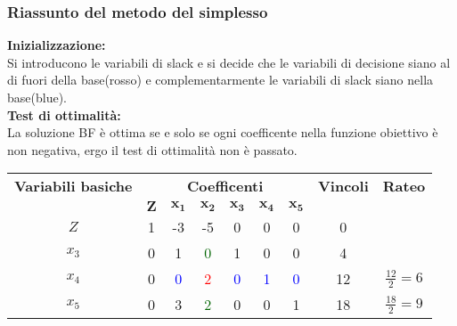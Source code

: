 \documentclass{article}
\begin{document}
\subsubsection{Riassunto del metodo del simplesso}
\textbf{Inizializzazione:} \\
Si introducono le variabili di slack e si decide che le variabili di decisione siano al di fuori della base(rosso) e complementarmente le variabili di slack siano nella base(blue). \\
\textbf{Test di ottimalità:} \\
La soluzione BF è ottima se e solo se ogni coefficente nella funzione obiettivo è non negativa, ergo il test di ottimalità non è passato.\\
\begin{table}[h]
  \centering
  \begin{tabular}{|c|c|c|c|c|c|c|c|c|}
    \hline
    {\textbf{Variabili basiche}} & \multicolumn{6}{|c|}{\textbf{Coefficenti}} & \textbf{Vincoli}    & \textbf{Rateo}                                                                                                     \\
    \cline{1-9}
                                 & $\mathbf{Z}$                               & $\mathbf{x_1}$      & $\mathbf{x_2}$           & $\mathbf{x_3}$      & $\mathbf{x_4}$      & $\mathbf{x_5}$      &    &                  \\
    \hline
    $Z$                          & 1                                          & -3                  & -5                       & 0                   & 0                   & 0                   & 0  &                  \\
    $x_3$                        & 0                                          & 1                   & \textcolor{darkgreen}{0} & 1                   & 0                   & 0                   & 4  &                  \\
    $x_4$                        & 0                                          & \textcolor{blue}{0} & \textcolor{red}{2}       & \textcolor{blue}{0} & \textcolor{blue}{1} & \textcolor{blue}{0} & 12 & $\frac{12}{2}=6$ \\
    $x_5$                        & 0                                          & 3                   & \textcolor{darkgreen}{2} & 0                   & 0                   & 1                   & 18 & $\frac{18}{2}=9$ \\
    \hline
  \end{tabular}
\end{table}
\end{document}
